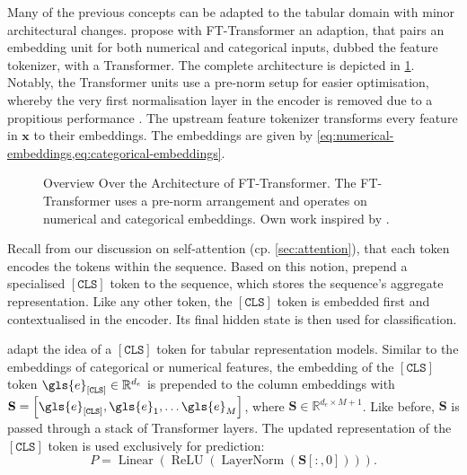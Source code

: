 Many of the previous concepts can be adapted to the tabular domain with minor architectural changes. \textcite[][5]{gorishniyRevisitingDeepLearning2021} propose with FT-Transformer an adaption, that pairs an embedding unit for both numerical and categorical inputs, dubbed the feature tokenizer, with a Transformer. The complete architecture is depicted in \cref{fig:fttransformer}. Notably, the Transformer units use a pre-norm setup for easier optimisation, whereby the very first normalisation layer in the encoder is removed due to a propitious performance \textcite[][17]{gorishniyRevisitingDeepLearning2021}. The upstream feature tokenizer transforms every feature in $\mathbf{x}$ to their embeddings. The embeddings are given by \cref{eq:numerical-embeddings,eq:categorical-embeddings}.

\begin{figure}[ht]
    \centering
    {\renewcommand\normalsize{\scriptsize}
        \normalsize
        }
    \caption[Overview Over the FT-Transformer Architecture]{Overview Over the Architecture of FT-Transformer. The FT-Transformer uses a pre-norm arrangement and operates on numerical and categorical embeddings. Own work inspired by \textcite[][4--5]{gorishniyRevisitingDeepLearning2021}.}
    \label{fig:fttransformer}
\end{figure}

Recall from our discussion on self-attention (cp. \cref{sec:attention}), that each \gls{token} encodes the \glspl{token} within the sequence. Based on this notion, \textcite[][4174]{devlinBERTPretrainingDeep2019} prepend a specialised $\mathtt{[CLS]}$ \gls{token} to the sequence, which stores the sequence's aggregate representation. Like any other \gls{token}, the $\mathtt{[CLS]}$ \gls{token} is embedded first and contextualised in the encoder. Its final hidden state is then used for classification.

\textcite[][4]{gorishniyRevisitingDeepLearning2021} adapt the idea of a $\mathtt{[CLS]}$ \gls{token} for tabular representation models. Similar to the embeddings of categorical or numerical features, the embedding of the $[\mathtt{CLS}]$ \gls{token} $\gls{e}_\mathtt{[CLS]} \in \mathbb{R}^{d_{e}}$ is prepended to the column embeddings with $\mathbf{S} = \left[\gls{e}_\mathtt{[CLS]}, \gls{e}_1, \ldots \gls{e}_{M}\right]$, where $\mathbf{S} \in \mathbb{R}^{d_{e} \times M +1}$. Like before, $\mathbf{S}$ is passed through a stack of Transformer layers. The updated representation of the $\mathtt{[CLS]}$ \gls{token} is used exclusively for prediction:
\begin{equation}
    P=\operatorname{Linear}\left(\operatorname{ReLU}\left(\operatorname{LayerNorm}\left(\mathbf{S}\left[:,0\right]\right)\right)\right).
    \label{eq:bert-ft}
\end{equation}

